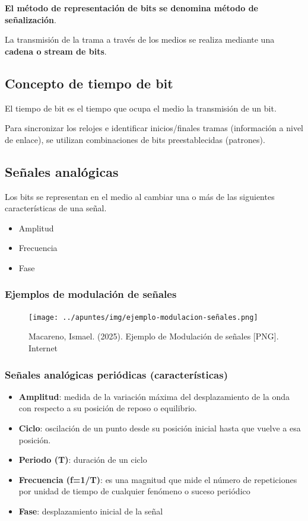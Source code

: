 \documentclass[11pt]{article}
\begin{document}
\textbf{El método de representación de bits se denomina método de señalización}.

La transmisión de la trama a través de los medios se realiza mediante una \textbf{cadena o stream de bits}.

\subsection{Concepto de tiempo de bit}
\label{sec:org74c7f24}
El tiempo de bit es el tiempo que ocupa el medio la transmisión de un bit.

Para sincronizar los relojes e identificar inicios/finales tramas (información a nivel de enlace), se utilizan combinaciones de bits
preestablecidas (patrones).

\subsection{Señales analógicas}
\label{sec:orgb372a96}
Los bits se representan en el medio al cambiar una o más de las siguientes características de una señal.
\begin{itemize}
\item Amplitud
\item Frecuencia
\item Fase
\end{itemize}

\subsubsection{Ejemplos de modulación de señales}
\label{sec:org605f1fd}
\begin{figure}[htbp]
\centering
\texttt{[image: ../apuntes/img/ejemplo-modulacion-señales.png]}
\caption{Macareno, Ismael. (2025). Ejemplo de Modulación de señales [PNG]. Internet}
\end{figure}

\subsubsection{Señales analógicas periódicas (características)}
\label{sec:orge676ca9}
\begin{itemize}
\item \textbf{Amplitud}: medida de la variación máxima del desplazamiento de la onda con respecto a su posición de reposo o equilibrio.
\item \textbf{Ciclo}: oscilación de un punto desde su posición inicial hasta que vuelve a esa posición.
\item \textbf{Periodo (T)}: duración de un ciclo
\item \textbf{Frecuencia (f=1/T)}: es una magnitud que mide el número de repeticiones por unidad de tiempo de cualquier fenómeno o suceso periódico
\item \textbf{Fase}: desplazamiento inicial de la señal
\end{itemize}
\end{document}
